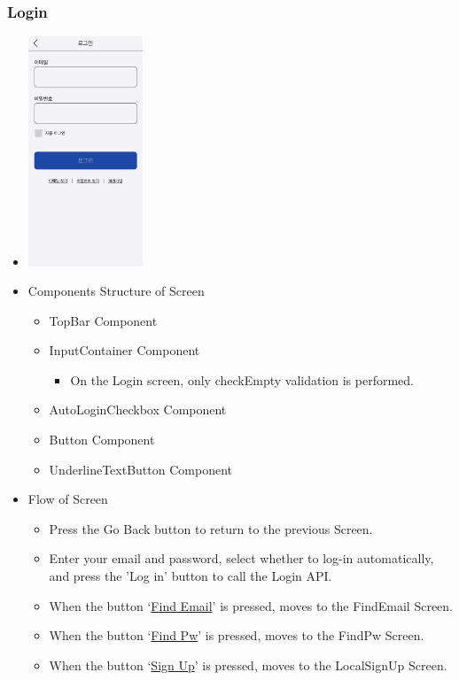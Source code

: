 \documentclass[conference]{IEEEtran}
\begin{document}
\subsubsection{Login}
\begin{itemize}
    \item[] \includegraphics[width=0.27\textwidth]{img/Screen/3_Login.png}
    \item Components Structure of Screen
    \begin{itemize}
        \item TopBar Component
        \item InputContainer Component
        \begin{itemize}
            \item On the Login screen, only checkEmpty validation is performed.
        \end{itemize}
        \item AutoLoginCheckbox Component
        \item Button Component
        \item UnderlineTextButton Component
    \end{itemize}
    \item Flow of Screen
    \begin{itemize}
        \item Press the Go Back button to return to the previous Screen.
        \item Enter your email and password, select whether to log-in automatically, and press the 'Log in' button to call the Login API.
        \item When the button ‘\underline{Find Email}’ is pressed, moves to the FindEmail Screen.
        \item When the button ‘\underline{Find Pw}’ is pressed, moves to the FindPw Screen.
        \item When the button ‘\underline{Sign Up}’ is pressed, moves to the LocalSignUp Screen.
        \\
    \end{itemize}
\end{itemize}
\newpage
\end{document}
